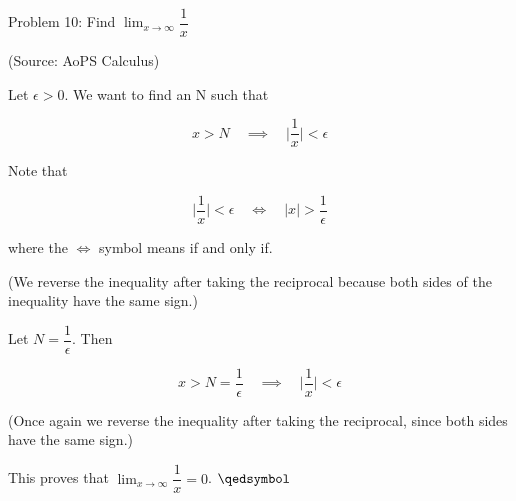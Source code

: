 \usepackage{amsthm}

Problem 10: Find $\lim_{x \rightarrow \infty} \dfrac{1}{x}$

(Source: AoPS Calculus)

Let $\epsilon > 0$. We want to find an N such that 

$$ x > N \quad \implies \quad \Bigg|\frac{1}{x}\Bigg| < \epsilon $$

Note that

$$ \Bigg|\frac{1}{x}\Bigg| < \epsilon \quad \Leftrightarrow \quad |x| > \frac{1}{\epsilon} $$

where the $\Leftrightarrow$ symbol means if and only if.

(We reverse the inequality after taking the reciprocal because both sides of the inequality have the same sign.)

Let $N = \dfrac{1}{\epsilon}$. Then

$$ x > N = \frac{1}{\epsilon} \quad \implies \quad \Bigg|\frac{1}{x}\Bigg| < \epsilon $$

(Once again we reverse the inequality after taking the reciprocal, since both sides have the same sign.)

This proves that $\lim_{x \rightarrow \infty} \dfrac{1}{x} = 0$. $\qedsymbol$
